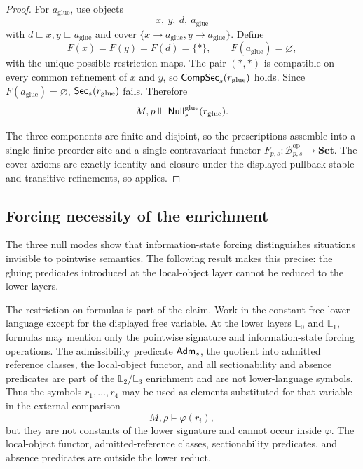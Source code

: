 \begin{proof}
For $a_{\mathrm{glue}}$, use objects
\[
x,\ y,\ d,\ a_{\mathrm{glue}}
\]
with $d\sqsubseteq x,y\sqsubseteq a_{\mathrm{glue}}$ and cover
$\{x\to a_{\mathrm{glue}},y\to a_{\mathrm{glue}}\}$. Define
\[
F(x)=F(y)=F(d)=\{*\},\qquad F(a_{\mathrm{glue}})=\varnothing ,
\]
with the unique possible restriction maps. The pair $(*,*)$ is compatible on
every common refinement of $x$ and $y$, so $\mathsf{CompSec}_s(r_{\mathrm{glue}})$
holds. Since $F(a_{\mathrm{glue}})=\varnothing$, $\mathsf{Sec}_s(r_{\mathrm{glue}})$
fails. Therefore
\[
M,p\Vdash \mathsf{Null}^{\mathrm{glue}}_s(r_{\mathrm{glue}}).
\]

The three components are finite and disjoint, so the prescriptions assemble
into a single finite preorder site and a single contravariant functor
$F_{p,s}:\mathcal B_{p,s}^{\mathrm{op}}\to\mathbf{Set}$. The cover axioms are
exactly identity and closure under the displayed pullback-stable and transitive
refinements, so  applies.
\end{proof}

\subsection{Forcing necessity of the enrichment}

The three null modes show that information-state forcing distinguishes situations invisible to pointwise semantics. The following result makes this precise: the gluing predicates introduced at the local-object layer cannot be reduced to the lower layers.

The restriction on formulas is part of the claim. Work in the constant-free
lower language except for the displayed free variable. At the lower layers
$\mathbb L_0$ and $\mathbb L_1$, formulas may mention only the pointwise
signature and information-state forcing operations. The admissibility predicate
$\mathsf{Adm}_s$, the quotient into admitted reference classes, the local-object
functor, and all sectionability and absence predicates are part of the
$\mathbb L_2/\mathbb L_3$ enrichment and are not lower-language symbols. Thus
the symbols $r_1,\ldots,r_4$ may be used as elements substituted for that
variable in the external comparison
\[
M,\rho\models\varphi(r_i),
\]
but they are not constants of the lower signature and cannot occur inside $\varphi$. The local-object functor, admitted-reference classes, sectionability predicates, and absence predicates are outside the lower reduct.

